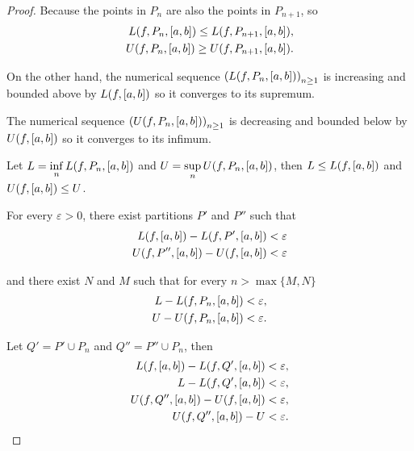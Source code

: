 \begin{proof}
    Because the points in $P_{n}$ are also the points in $P_{n+1}$, so
    \[
        \begin{split}
            L(f, P_{n}, \left[{a, b}\right])\leq L(f, P_{n+1}, \left[{a,b}\right]), \\
            U(f, P_{n}, \left[{a, b}\right])\geq U(f, P_{n+1}, \left[{a, b}\right]).
        \end{split}
    \]

    On the other hand, the numerical sequence ${(L(f, P_{n}, \left[{a, b}\right]))}_{n\geq 1}$ is increasing and bounded above by $L(f, \left[{a, b}\right])$ so it converges to its supremum.

    The numerical sequence ${(U(f, P_{n}, \left[{a, b}\right]))}_{n\geq 1}$ is decreasing and bounded below by $U(f, \left[{a, b}\right])$ so it converges to its infimum.

    Let $L = \inf\limits_{n}L(f, P_{n}, \left[{a, b}\right])$ and $U = \sup\limits_{n}U(f, P_{n}, \left[{a, b}\right])$, then $L\leq L(f, \left[{a, b}\right])$ and $U(f, \left[{a, b}\right])\leq U$.

    For every $\varepsilon > 0$, there exist partitions $P'$ and $P''$ such that
    \[
        \begin{split}
            L(f, \left[{a, b}\right]) - L(f, P', \left[{a, b}\right]) < \varepsilon \\
            U(f, P'', \left[{a, b}\right]) - U(f, \left[{a, b}\right]) < \varepsilon
        \end{split}
    \]

    and there exist $N$ and $M$ such that for every $n > \max\{ M, N \}$
    \[
        \begin{split}
            L - L(f, P_{n}, \left[{a, b}\right]) < \varepsilon, \\
            U - U(f, P_{n}, \left[{a, b}\right]) < \varepsilon.
        \end{split}
    \]

    Let $Q' = P'\cup P_{n}$ and $Q'' = P''\cup P_{n}$, then
    \[
        \begin{split}
            L(f, \left[{a, b}\right]) - L(f, Q', \left[{a, b}\right]) < \varepsilon,  \\
            L - L(f, Q', \left[{a, b}\right]) < \varepsilon,                            \\
            U(f, Q'', \left[{a, b}\right]) - U(f, \left[{a, b}\right]) < \varepsilon, \\
            U(f, Q'', \left[{a, b}\right]) - U < \varepsilon.
        \end{split}
    \]


\end{proof}
